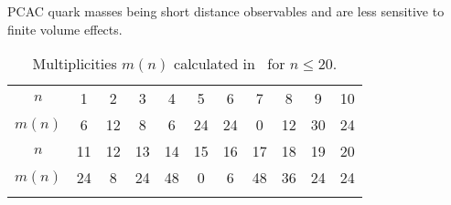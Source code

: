 PCAC quark masses being short distance observables and are less sensitive to finite volume effects.

\vspace{2cm}

\begin{longtable}{c c c c c c c c c c c}
\toprule
$n$ & 1 & 2 & 3 & 4 & 5 & 6 & 7 & 8 & 9 & 10 \\
$m(n)$ & 6 & 12 & 8 & 6 & 24 & 24 & 0 & 12 & 30 & 24 \\
\midrule
$n$ & 11 & 12 & 13 & 14 & 15 & 16 & 17 & 18 & 19 & 20 \\
$m(n)$ & 24 & 8 & 24 & 48 & 0 & 6 & 48 & 36 & 24 & 24 \\
\bottomrule
\caption{Multiplicities $m(n)$ calculated in~\citep{Colangelo:2003hf} for $n\leq20$.}
\label{apex_fv:tab:mn}
\end{longtable}


